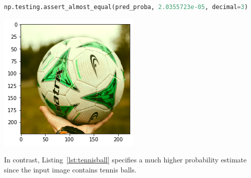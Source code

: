 \documentclass[acmsmall,screen,review,anonymous]{acmart}
\begin{document}
\begin{minipage}{0.5\textwidth}
  \begin{lstlisting}[language=Python]
np.testing.assert_almost_equal(pred_proba, 2.0355723e-05, decimal=3)
  \end{lstlisting}
  \label{lst:football}
\end{minipage}
\begin{minipage}{0.5\textwidth}
  \includegraphics[width=\linewidth]{../catalogue/select-35a.png}
  \label{fig:football}
\end{minipage}

In contrast, Listing~\ref{lst:tennisball} specifies a much higher probability estimate since the input image contains tennis balls.
\end{document}
